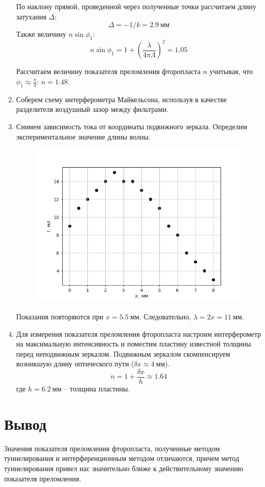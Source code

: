 \documentclass[14pt, a4paper]{report}
\begin{document}
\begin{enumerate}
По наклону прямой, проведенной через полученные точки рассчитаем длину затухания $\Delta$:
\[\Delta=-1/k=2.9\ мм\]
Также величину $n\sin{\phi_1}$:
\[n\sin{\phi_1}=1+\left(\frac{\lambda}{4\pi\Lambda}\right)^2=1.05\]

Рассчитаем величину показателя преломления фторопласта $n$ учитывая, что $\phi_1\approx\frac{\pi}{4}$: $n=1.48$.

\item Соберем схему интерферометра Майкельсона, используя в качестве разделителя воздушный зазор между фильтрами.

\item Снимем зависимость тока от координаты подвижного зеркала. Определим экспериментальное значение длины волны. 

\begin{figure}[H]
\centering
\includegraphics[scale=0.5]{../images/462_5.png}
\end{figure}

Показания повторяются при $x=5.5\ мм$. Следовательно, $\lambda=2x=11\ мм$.

\item Для измерения показателя преломления фторопласта настроим интерферометр на максимальную интенсивность и поместим пластину известной толщины перед неподвижным зеркалом. Подвижным зеркалом скомпенсируем возникшую длину оптического пути ($\delta x\approx4\ мм$).
\[n=1+\frac{\delta x}{h}\approx1.64\]
где $h=6.2\ мм$ -- толщина пластины.

\end{enumerate}

\section{Вывод}

Значения показателя преломления фторопласта, полученные методом туннелирования и интерференционным методом отличаются, причем метод туннелирования привел нас значительно ближе к действительному значению показателя преломления.
\end{document}
